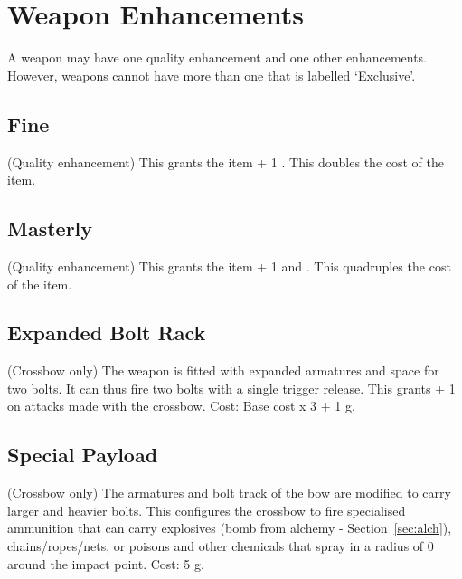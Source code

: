 \section{Weapon Enhancements}
A weapon may have one quality enhancement and one other enhancements. However, weapons cannot have more than one that is labelled `Exclusive'.


\subsection{Fine}
(Quality enhancement) This grants the item + 1 . This doubles the cost of the item. 

\subsection{Masterly}
(Quality enhancement) This grants the item + 1  and . This quadruples the cost of the item.

\subsection{Expanded Bolt Rack}
(Crossbow only) The weapon is fitted with expanded armatures and space for two bolts. It can thus fire two bolts with a single trigger release. This grants  + 1 on attacks made with the crossbow. Cost: Base cost x 3 + 1 g. 

\subsection{Special Payload}
(Crossbow only) The armatures and bolt track of the bow are modified to carry larger and heavier bolts. This configures the crossbow to fire specialised ammunition that can carry explosives (bomb from alchemy - Section~\ref{sec:alch}), chains/ropes/nets, or poisons and other chemicals that spray in a radius of 0 around the impact point. Cost: 5 g.

